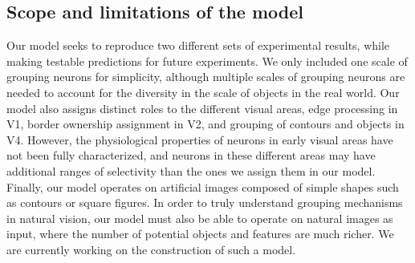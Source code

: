 \subsection{Scope and limitations of the model}
Our model seeks to reproduce two different sets of experimental
results, while making testable predictions for future experiments. 
We only included one scale of grouping neurons for
simplicity, although 
multiple scales of grouping
neurons are needed to account for the diversity in the scale of
objects in the real world.
Our model also assigns distinct roles to the
different visual areas,  edge processing in V1, border ownership
assignment in V2, and grouping of contours and objects in V4. However,
the physiological properties of neurons in early visual areas have not
been fully characterized, and 
neurons in these different
areas may have 
additional ranges of selectivity
than the ones we assign them in our model. 
Finally, our model operates on artificial
images composed of simple shapes such as contours or square
figures. In order to truly understand grouping mechanisms in natural
vision, our model must also be able to operate on natural images as
input, where the number of potential objects and features are much
richer. We are currently working  
on the construction of such a model.

%
%


